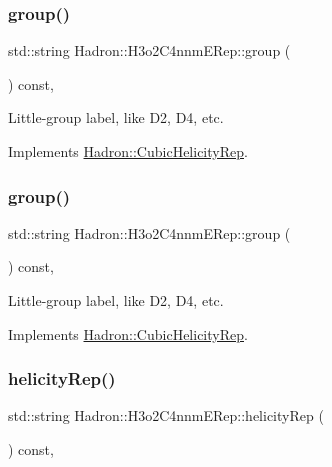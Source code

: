\subsubsection{\texorpdfstring{group()}{group()}\hspace{0.1cm}{\footnotesize\ttfamily [2/3]}}
{\footnotesize\ttfamily std\+::string Hadron\+::\+H3o2\+C4nnm\+E\+Rep\+::group (\begin{DoxyParamCaption}{ }\end{DoxyParamCaption}) const\hspace{0.3cm}{\ttfamily [inline]}, {\ttfamily [virtual]}}

Little-\/group label, like D2, D4, etc. 

Implements \mbox{\hyperlink{structHadron_1_1CubicHelicityRep_a101a7d76cd8ccdad0f272db44b766113}{Hadron\+::\+Cubic\+Helicity\+Rep}}.

\mbox{\label{structHadron_1_1H3o2C4nnmERep_a94fc651e597e1a65fb7be16b3b6e8ef9}} 
\subsubsection{\texorpdfstring{group()}{group()}\hspace{0.1cm}{\footnotesize\ttfamily [3/3]}}
{\footnotesize\ttfamily std\+::string Hadron\+::\+H3o2\+C4nnm\+E\+Rep\+::group (\begin{DoxyParamCaption}{ }\end{DoxyParamCaption}) const\hspace{0.3cm}{\ttfamily [inline]}, {\ttfamily [virtual]}}

Little-\/group label, like D2, D4, etc. 

Implements \mbox{\hyperlink{structHadron_1_1CubicHelicityRep_a101a7d76cd8ccdad0f272db44b766113}{Hadron\+::\+Cubic\+Helicity\+Rep}}.

\mbox{\label{structHadron_1_1H3o2C4nnmERep_a4ca04daa91fc608d0c528d0e0eb6a24e}} 
\subsubsection{\texorpdfstring{helicityRep()}{helicityRep()}\hspace{0.1cm}{\footnotesize\ttfamily [1/3]}}
{\footnotesize\ttfamily std\+::string Hadron\+::\+H3o2\+C4nnm\+E\+Rep\+::helicity\+Rep (\begin{DoxyParamCaption}{ }\end{DoxyParamCaption}) const\hspace{0.3cm}{\ttfamily [inline]}, {\ttfamily [virtual]}}

